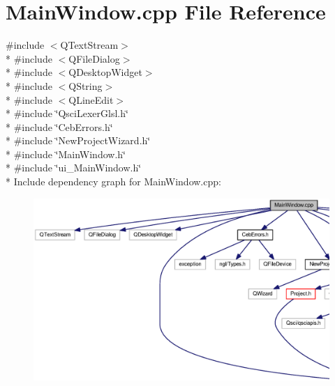 \section{Main\-Window.\-cpp File Reference}
\label{_main_window_8cpp}
{\ttfamily \#include $<$Q\-Text\-Stream$>$}\\*
{\ttfamily \#include $<$Q\-File\-Dialog$>$}\\*
{\ttfamily \#include $<$Q\-Desktop\-Widget$>$}\\*
{\ttfamily \#include $<$Q\-String$>$}\\*
{\ttfamily \#include $<$Q\-Line\-Edit$>$}\\*
{\ttfamily \#include \char`\"{}Qsci\-Lexer\-Glsl.\-h\char`\"{}}\\*
{\ttfamily \#include \char`\"{}Ceb\-Errors.\-h\char`\"{}}\\*
{\ttfamily \#include \char`\"{}New\-Project\-Wizard.\-h\char`\"{}}\\*
{\ttfamily \#include \char`\"{}Main\-Window.\-h\char`\"{}}\\*
{\ttfamily \#include \char`\"{}ui\-\_\-\-Main\-Window.\-h\char`\"{}}\\*
Include dependency graph for Main\-Window.\-cpp\-:
\nopagebreak
\begin{figure}[H]
\begin{center}
\leavevmode
\includegraphics[width=350pt]{_main_window_8cpp__incl}
\end{center}
\end{figure}
